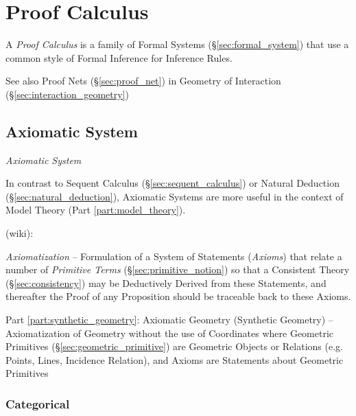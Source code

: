 \section{Proof Calculus}\label{sec:proof_calculus}

A \emph{Proof Calculus} is a family of Formal Systems
(\S\ref{sec:formal_system}) that use a common style of Formal
Inference for Inference Rules.

\fist See also Proof Nets (\S\ref{sec:proof_net}) in Geometry of
Interaction (\S\ref{sec:interaction_geometry})



\subsection{Axiomatic System} \label{sec:axiomatic_system}

\emph{Axiomatic System}

In contrast to Sequent Calculus (\S\ref{sec:sequent_calculus}) or Natural
Deduction (\S\ref{sec:natural_deduction}), Axiomatic Systems are more useful in
the context of Model Theory (Part \ref{part:model_theory}).

(wiki):

\emph{Axiomatization} -- Formulation of a System of Statements (\emph{Axioms})
that relate a number of \emph{Primitive Terms} (\S\ref{sec:primitive_notion}) so
that a Consistent Theory (\S\ref{sec:consistency}) may be Deductively Derived
from these Statements, and thereafter the Proof of any Proposition should be
traceable back to these Axioms.

\fist Part \ref{part:synthetic_geometry}: Axiomatic Geometry (Synthetic
Geometry) -- Axiomatization of Geometry without the use of Coordinates where
Geometric Primitives (\S\ref{sec:geometric_primitive}) are Geometric Objects or
Relations (e.g. Points, Lines, Incidence Relation), and Axioms are Statements
about Geometric Primitives



\subsubsection{Categorical}\label{sec:categorical}

